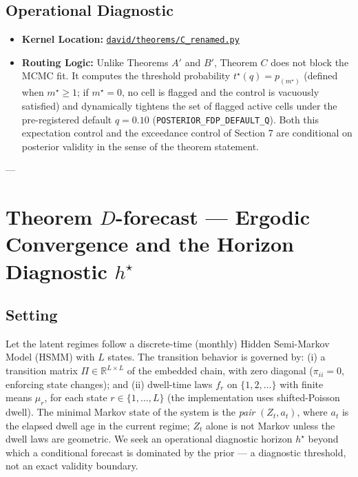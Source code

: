 \documentclass[11pt,a4paper]{article}
\begin{document}
\subsection{Operational Diagnostic}
\begin{itemize}
    \item \textbf{Kernel Location:} \href{file:///Users/arbenlila/development/david/canonical/david/theorems/C_renamed.py}{\texttt{david/theorems/C\_renamed.py}}
    \item \textbf{Routing Logic:} Unlike Theorems $A'$ and $B'$, Theorem $C$ does not block the MCMC fit. It computes the threshold probability $t^\star(q) = p_{(m^\star)}$ (defined when $m^\star \ge 1$; if $m^\star = 0$, no cell is flagged and the control is vacuously satisfied) and dynamically tightens the set of flagged active cells under the pre-registered default $q = 0.10$ (\texttt{POSTERIOR\_FDP\_DEFAULT\_Q}). Both this expectation control and the exceedance control of Section 7 are conditional on posterior validity in the sense of the theorem statement. %
\end{itemize}

---

\section{Theorem $D$-forecast --- Ergodic Convergence and the Horizon Diagnostic $h^\star$}

\subsection{Setting}
Let the latent regimes follow a discrete-time (monthly) Hidden Semi-Markov Model (HSMM) with $L$ states. The transition behavior is governed by: (i) a transition matrix $\Pi \in \mathbb{R}^{L \times L}$ of the embedded chain, with zero diagonal ($\pi_{ii} = 0$, enforcing state changes); and (ii) dwell-time laws $f_r$ on $\{1, 2, \dots\}$ with finite means $\mu_r$, for each state $r \in \{1, \dots, L\}$ (the implementation uses shifted-Poisson dwell). The minimal Markov state of the system is the \emph{pair} $(Z_t, a_t)$, where $a_t$ is the elapsed dwell age in the current regime; $Z_t$ alone is not Markov unless the dwell laws are geometric. We seek an operational diagnostic horizon $h^\star$ beyond which a conditional forecast is dominated by the prior --- a diagnostic threshold, not an exact validity boundary. %
\end{document}
